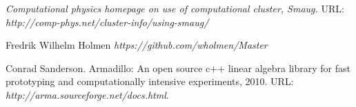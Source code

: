 \documentclass[twoside,english]{uiofysmaster}
\begin{document}
\begin{thebibliography}{9}
	\textit{Computational physics homepage on use of computational cluster, Smaug.}
	URL: \textit{http://comp-phys.net/cluster-info/using-smaug/}

	Fredrik Wilhelm Holmen
	\textit{https://github.com/wholmen/Master} 

	Conrad Sanderson. Armadillo: An open source c++ linear algebra library for fast prototyping and computationally intensive experiments, 2010.
	URL: \textit{http://arma.sourceforge.net/docs.html}.

\end{thebibliography}
\end{document}
